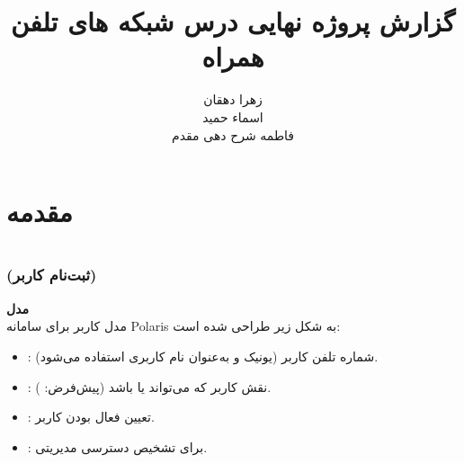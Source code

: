 \documentclass{report}
\title{گزارش پروژه نهایی درس شبکه های تلفن همراه}
\author{زهرا دهقان\\اسماء حمید\\فاطمه شرح دهی مقدم}
\begin{document}
\Godpage
\maketitle
{}
\tableofcontents


\chapter{مقدمه}



\chapter{ }

\chapter{ }

\section{ }

\chapter{ }

\section{}

\subsection{ (ثبت‌نام کاربر)}
\textbf{مدل } \\
مدل کاربر برای سامانه Polaris به شکل زیر طراحی شده است:

\begin{itemize}
  \item {}: شماره تلفن کاربر (یونیک و به‌عنوان نام کاربری استفاده می‌شود).
  \item {}: نقش کاربر که می‌تواند  یا  باشد (پیش‌فرض: ).
  \item {}: تعیین فعال بودن کاربر.
  \item {}: برای تشخیص دسترسی مدیریتی.
\end{itemize}
\end{document}
